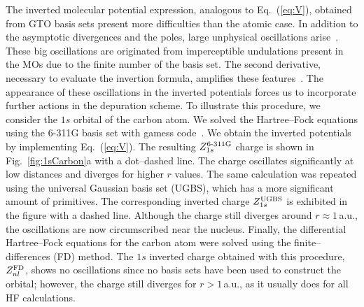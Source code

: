\documentclass[10pt]{article}
\begin{document}
The inverted molecular potential expression, analogous 
to Eq.~(\ref{eq:V}), obtained from GTO basis sets present more difficulties
than the atomic case. In addition to the asymptotic divergences and
the poles, large unphysical 
oscillations arise~\cite{Schipper1997,Mura1997,Jacob2011,Gaiduk2013}. 
These big oscillations are originated from imperceptible undulations 
present in the MOs due to the finite number of the basis set. The
second derivative, necessary to evaluate the invertion formula, amplifies
these features~\cite{Schipper1997,Gaiduk2013}.
The appearance of these oscillations in the inverted potentials forces us to
incorporate further actions in the depuration scheme. To illustrate 
this procedure, we consider the $1s$ orbital of the carbon atom. 
We solved the Hartree--Fock equations using the \mbox{6-311G} basis set 
with {\sc gamess} code~\cite{Schmidt1993,Gordon2005}.
We obtain the inverted potentials by implementing Eq.~(\ref{eq:V}). 
The resulting $Z_{1s}^{\mbox{\scriptsize 6-311G}}$ charge is shown in 
Fig.~\ref{fig:1sCarbon}a with a dot--dashed line. 
The charge oscillates significantly at low distances and diverges for 
higher $r$ values. The same calculation was 
repeated using the universal Gaussian basis set (UGBS), which has a 
more significant amount of primitives. The corresponding inverted 
charge $Z_{1s}^{\mbox{\scriptsize UGBS}}$ is exhibited in the figure 
with a dashed line. 
Although the charge still diverges around $r\approx1\,$a.u., the 
oscillations are now circumscribed near the nucleus.
Finally, the differential Hartree--Fock equations for the carbon 
atom were solved using the finite--differences (FD) method. 
The $1s$ inverted charge obtained with this procedure, 
$Z_{nl}^{\mbox{\scriptsize FD}}$, shows no oscillations since no basis 
sets have 
been used to construct the orbital; however, the charge still 
diverges for $r>1\,$a.u., as it usually does for all HF calculations.
\end{document}
